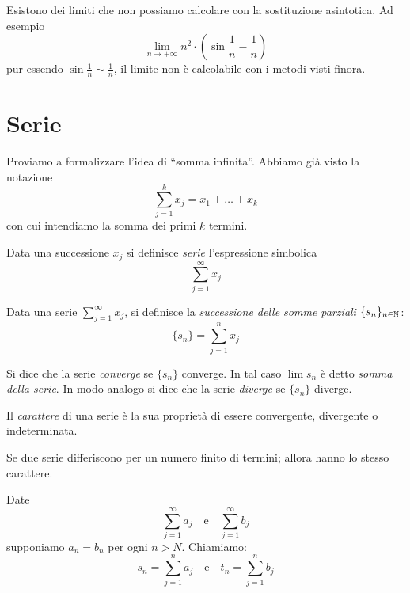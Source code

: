 \begin{example}
Esistono dei limiti che non possiamo calcolare con la sostituzione asintotica. Ad esempio 
\begin{equation*}
\lim_{n \to +\infty} n^2 \cdot \left(\sin \frac{1}{n} - \frac{1}{n}\right)
\end{equation*}
pur essendo $\sin \frac{1}{n} \sim \frac{1}{n}$, il limite non è calcolabile con i metodi visti finora.
\end{example}

\section{Serie}
Proviamo a formalizzare l'idea di ``somma infinita''. Abbiamo già visto la notazione
\begin{equation*}
\sum_{j=1}^k x_j = x_1 + \ldots + x_k
\end{equation*}
con cui intendiamo la somma dei primi $k$ termini. 

\begin{definition}
Data una successione $x_j$ si definisce \emph{serie} l'espressione simbolica
\begin{equation*}
\sum_{j=1}^\infty x_j
\end{equation*}
\end{definition}

Data una serie $\sum_{j=1}^\infty x_j$, si definisce la \emph{successione delle somme parziali} $\{s_n\}_{n \in \mathbb N}$:
\begin{equation*}
\{s_n\} = \sum_{j=1}^n x_j
\end{equation*}

Si dice che la serie \emph{converge} se $\{s_n\}$ converge. In tal caso $\lim s_n$ è detto \emph{somma della serie}. In modo analogo si dice che la serie \emph{diverge} se $\{s_n\}$ diverge.

Il \emph{carattere} di una serie è la sua proprietà di essere convergente, divergente o indeterminata.

\begin{remark}
Se due serie differiscono per un numero finito di termini; allora hanno lo stesso carattere.
\end{remark}
Date
\begin{equation*}
\sum_{j=1}^\infty a_j \quad \text{e} \quad \sum_{j=1}^\infty b_j
\end{equation*}
supponiamo $a_n = b_n$ per ogni $n > N$. Chiamiamo:
\begin{equation*}
s_n = \sum_{j=1}^n a_j \quad \text{e} \quad t_n = \sum_{j=1}^n b_j
\end{equation*}

